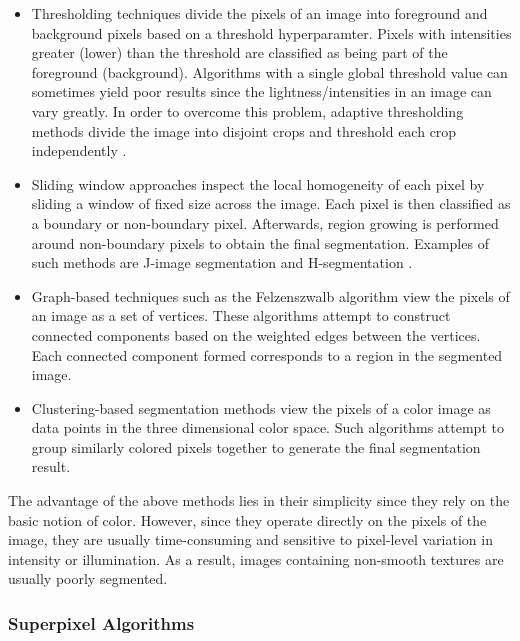 \begin{itemize}
    \item Thresholding techniques divide the pixels of an image into foreground and background pixels based on a threshold hyperparamter. Pixels with intensities greater (lower) than the threshold are classified as being part of the foreground (background). Algorithms with a single global threshold value can sometimes yield poor results since the lightness/intensities in an image can vary greatly. In order to overcome this problem, adaptive thresholding methods divide the image into disjoint crops and threshold each crop independently \parencite{bradley2007adaptive}.
    \item Sliding window approaches inspect the local homogeneity of each pixel by sliding a window of fixed size across the image. Each pixel is then classified as a boundary or non-boundary pixel. Afterwards, region growing is performed around non-boundary pixels to obtain the final segmentation. Examples of such methods are J-image segmentation \parencite{deng2001unsupervised}  and H-segmentation \parencite{jing2003unsupervised}.
    \item Graph-based techniques such as the Felzenszwalb algorithm \parencite{felzenszwalb2004efficient} view the pixels of an image as a set of vertices. These algorithms attempt to construct connected components based on the weighted edges between the vertices. Each connected component formed corresponds to a region in the segmented image.
    \item Clustering-based segmentation methods view the pixels of a color image as data points in the three dimensional color space. Such algorithms attempt to group similarly colored pixels together to generate the final segmentation result.
\end{itemize}

The advantage of the above methods lies in their simplicity since they rely on the basic notion of color. However, since they operate directly on the pixels of the image, they are usually time-consuming and sensitive to pixel-level variation in intensity or illumination. As a result, images containing non-smooth textures are usually poorly segmented.

\subsubsection{Superpixel Algorithms}

